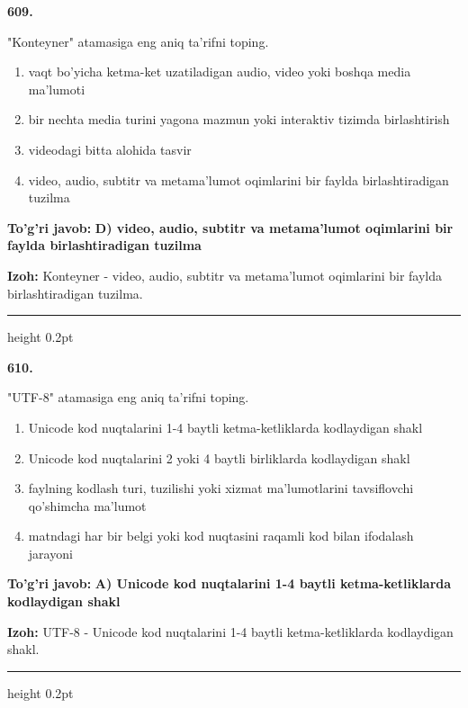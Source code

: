 \documentclass[10pt,a4paper,oneside]{article}
\begin{document}
\noindent\textbf{\color{ink}609.}
\par
"Konteyner" atamasiga eng aniq ta'rifni toping.
\begin{enumerate}[label=\Alph*),leftmargin=9mm]
\item vaqt bo'yicha ketma-ket uzatiladigan audio, video yoki boshqa media ma'lumoti
\item bir nechta media turini yagona mazmun yoki interaktiv tizimda birlashtirish
\item videodagi bitta alohida tasvir
\item video, audio, subtitr va metama'lumot oqimlarini bir faylda birlashtiradigan tuzilma
\end{enumerate}
\begin{tcolorbox}[enhanced,breakable,colback=teal!4,colframe=teal!50!black,boxrule=0.5pt,arc=1.1mm,left=3mm,right=3mm,top=1.7mm,bottom=1.7mm,before skip=2mm,after skip=2mm]
\textbf{\color{teal}To'g'ri javob:} \textbf{D) video, audio, subtitr va metama'lumot oqimlarini bir faylda birlashtiradigan tuzilma}
\par\smallskip
\textbf{Izoh:} Konteyner - video, audio, subtitr va metama'lumot oqimlarini bir faylda birlashtiradigan tuzilma.
\end{tcolorbox}
\vspace{2mm}\hrule height 0.2pt \vspace{3mm}

\noindent\textbf{\color{ink}610.}
\par
"UTF-8" atamasiga eng aniq ta'rifni toping.
\begin{enumerate}[label=\Alph*),leftmargin=9mm]
\item Unicode kod nuqtalarini 1-4 baytli ketma-ketliklarda kodlaydigan shakl
\item Unicode kod nuqtalarini 2 yoki 4 baytli birliklarda kodlaydigan shakl
\item faylning kodlash turi, tuzilishi yoki xizmat ma'lumotlarini tavsiflovchi qo'shimcha ma'lumot
\item matndagi har bir belgi yoki kod nuqtasini raqamli kod bilan ifodalash jarayoni
\end{enumerate}
\begin{tcolorbox}[enhanced,breakable,colback=teal!4,colframe=teal!50!black,boxrule=0.5pt,arc=1.1mm,left=3mm,right=3mm,top=1.7mm,bottom=1.7mm,before skip=2mm,after skip=2mm]
\textbf{\color{teal}To'g'ri javob:} \textbf{A) Unicode kod nuqtalarini 1-4 baytli ketma-ketliklarda kodlaydigan shakl}
\par\smallskip
\textbf{Izoh:} UTF-8 - Unicode kod nuqtalarini 1-4 baytli ketma-ketliklarda kodlaydigan shakl.
\end{tcolorbox}
\vspace{2mm}\hrule height 0.2pt \vspace{3mm}
\end{document}
